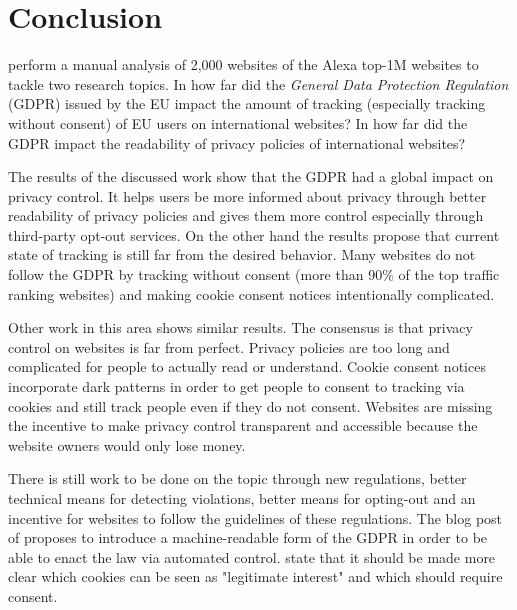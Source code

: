 \section{Conclusion}
\label{sec:conclusion}

\citeauthor{sanchez2019can} perform a manual analysis of 2,000 websites of the Alexa top-1M
websites to tackle two research topics. In how far did the \emph{General Data Protection Regulation} (GDPR) issued by the EU
impact the amount of tracking (especially tracking without consent) of EU users on international websites? In how far
did the GDPR impact the readability of privacy policies of international websites?

The results of the discussed work show that the GDPR had a global impact on privacy control. It helps users be more
informed about privacy through better readability of privacy policies and gives them more control especially through third-party opt-out services. On the other hand
the results propose that current state of tracking is still far from the desired behavior. Many websites do not follow
the GDPR by tracking without consent (more than 90\% of the top traffic ranking websites) and making cookie consent notices
intentionally complicated.

Other work in this area shows similar results. The consensus is that privacy control on
websites is far from perfect. Privacy policies are too long and complicated for people to actually read or understand.
Cookie consent notices incorporate dark patterns in order to get people to consent to tracking via cookies and still
track people even if they do not consent. Websites are missing the incentive to make privacy control transparent and
accessible because the website owners would only lose money.

There is still work to be done on the topic through new regulations, better technical means for detecting violations,
better means for opting-out and an incentive for websites to follow the guidelines of these regulations. The
blog post of  proposes to introduce a machine-readable form of the GDPR in order to be able to enact
the law via automated control.  state that it should be made more clear which cookies can be seen as
"legitimate interest" and which should require consent.

